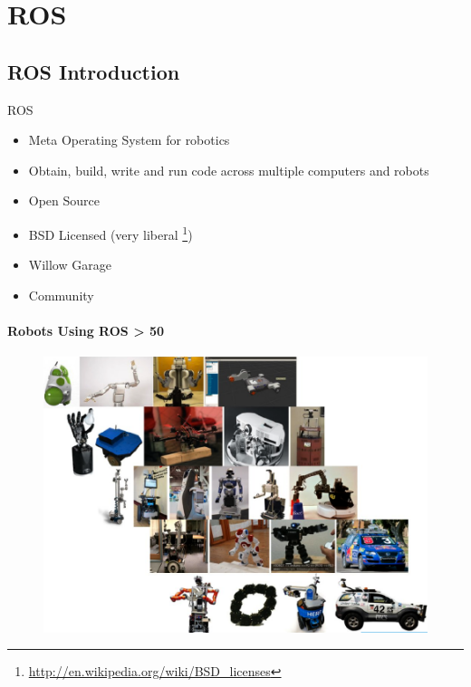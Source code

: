 
\lyxframeend{}\section{ROS}


\lyxframeend{}\subsection{ROS Introduction}


\lyxframeend{}

ROS
\begin{itemize}
\item Meta Operating System for robotics
\item Obtain, build, write and run code across multiple computers and robots
\item Open Source
\item BSD Licensed (very liberal%
\footnote{\href{http://en.wikipedia.org/wiki/BSD_licenses}{http://en.wikipedia.org/wiki/BSD\_{}licenses}%
})
\item Willow Garage
\item Community
\end{itemize}

\lyxframeend{}


\lyxframeend{}


\framesubtitle{Robots Using ROS > 50}

\noindent \begin{center}
\begin{figure}[H]
\noindent \centering{}\includegraphics[bb=0bp -160bp 952bp 480bp,height=0.8\paperheight]{images/ROSManyRobots}
\end{figure}

\par\end{center}


